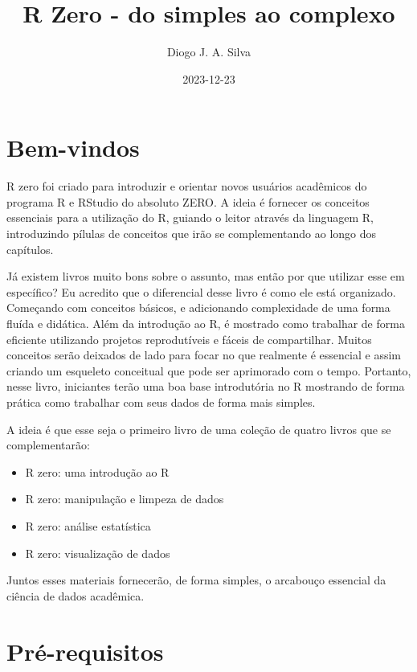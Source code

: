 \documentclass[
]{book}
\title{R Zero - do simples ao complexo}
\author{Diogo J. A. Silva}
\date{2023-12-23}
\providecommand{\tightlist}{%
  \setlength{\itemsep}{0pt}\setlength{\parskip}{0pt}}
\begin{document}
\maketitle

{
\setcounter{tocdepth}{1}
\tableofcontents
}
\hypertarget{bem-vindos}{%
\chapter{Bem-vindos}\label{bem-vindos}}

R zero foi criado para introduzir e orientar novos usuários acadêmicos do programa R e RStudio do absoluto ZERO. A ideia é fornecer os conceitos essenciais para a utilização do R, guiando o leitor através da linguagem R, introduzindo pílulas de conceitos que irão se complementando ao longo dos capítulos.

Já existem livros muito bons sobre o assunto, mas então por que utilizar esse em específico? Eu acredito que o diferencial desse livro é como ele está organizado. Começando com conceitos básicos, e adicionando complexidade de uma forma fluída e didática. Além da introdução ao R, é mostrado como trabalhar de forma eficiente utilizando projetos reprodutíveis e fáceis de compartilhar. Muitos conceitos serão deixados de lado para focar no que realmente é essencial e assim criando um esqueleto conceitual que pode ser aprimorado com o tempo. Portanto, nesse livro, iniciantes terão uma boa base introdutória no R mostrando de forma prática como trabalhar com seus dados de forma mais simples.

A ideia é que esse seja o primeiro livro de uma coleção de quatro livros que se complementarão:

\begin{itemize}
\tightlist
\item
  R zero: uma introdução ao R
\item
  R zero: manipulação e limpeza de dados
\item
  R zero: análise estatística
\item
  R zero: visualização de dados
\end{itemize}

Juntos esses materiais fornecerão, de forma simples, o arcabouço essencial da ciência de dados acadêmica.

\hypertarget{pruxe9-requisitos}{%
\chapter{Pré-requisitos}\label{pruxe9-requisitos}}
\end{document}
